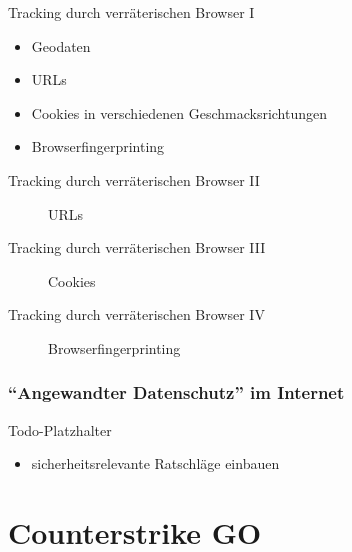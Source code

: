 \documentclass[utf8]{beamer}
\begin{document}
	
	\begin{frame}{Tracking durch verräterischen Browser I}
		\begin{itemize}
			\item Geodaten
			\item URLs 
			\item Cookies in verschiedenen Geschmacksrichtungen
			\item Browserfingerprinting
		\end{itemize}
	\end{frame}
	
	\begin{frame}{Tracking durch verräterischen Browser II}
		\begin{figure}[V]
			\label{fig:url shortener}
			\caption{URLs}
		\end{figure}
	\end{frame}

	\begin{frame}{Tracking durch verräterischen Browser III}
		\begin{figure}[V]
			\label{fig:lightbeam}
			\caption{Cookies}
		\end{figure}
	\end{frame}

	\begin{frame}{Tracking durch verräterischen Browser IV}
		\begin{figure}[V]
			\label{fig:panopticlick}
			\caption{Browserfingerprinting}
		\end{figure}
	\end{frame}
	
	\subsubsection{\enquote{Angewandter Datenschutz} im Internet}
	
		\begin{frame}{Todo-Platzhalter}
			\begin{itemize}
				\item sicherheitsrelevante Ratschläge einbauen

			\end{itemize}
		\end{frame}
	
	\section{Counterstrike GO}
\end{document}
